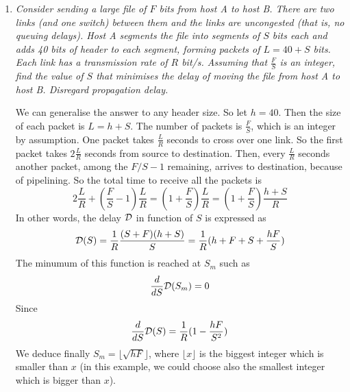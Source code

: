 \begin{enumerate}
  \item \emph{Consider sending a large file of \(F\) bits from host A
    to host B. There are two links (and one switch) between them and
    the links are uncongested (that is, no queuing delays). Host A
    segments the file into segments of \(S\) bits each and adds 40
    bits of header to each segment, forming packets of \(L = 40 + S\)
    bits. Each link has a transmission rate of \(R\) bit/s. Assuming
    that \(\frac{F}{S}\) is an integer, find the value of \(S\) that
    minimises the delay of moving the file from host A to host
    B. Disregard propagation delay.}

    We can generalise the answer to any header size. So let \(h =
    40\). Then the size of each packet is \(L = h + S\). The number of
    packets is \(\frac{F}{S}\), which is an integer by assumption. One
    packet takes \(\frac{L}{R}\) seconds to cross over one link. So
    the first packet takes \(2{\frac{L}{R}}\) seconds from source to
    destination. Then, every \(\frac{L}{R}\) seconds another packet,
    among the \(F/S-1\) remaining, arrives to destination, because of
    pipelining. So the total time to receive all the packets is
    \[
        2{\frac{L}{R}} + (\frac{F}{S}-1)\frac{L}{R}
      = (1 + \frac{F}{S})\frac{L}{R}
      = (1 + \frac{F}{S})\frac{h + S}{R}
    \]
    In other words, the delay \({\cal D}\) in function of \(S\) is
    expressed as
    \[
     {\cal D}(S) = \frac{1}{R}\frac{(S + F)(h + S)}{S} = \frac{1}{R}(h
     + F + S + \frac{hF}{S})
    \]
    The minumum of this function is reached at \(S_{m}\) such as
    \[
      \frac{d}{dS} {\cal D} (S_m) = 0
    \]
    Since
    \[
     \frac{d}{dS} {\cal D} (S) = \frac{1}{R}(1 - \frac{hF}{S^2})
    \]
    We deduce finally \(S_m = \lfloor\sqrt{hF}\rfloor\), where
    \(\lfloor{x}\rfloor\) is the biggest integer which is smaller than
    \(x\)  (in this example, we could choose also the smallest integer
    which is bigger than \(x\)).

\end{enumerate}
